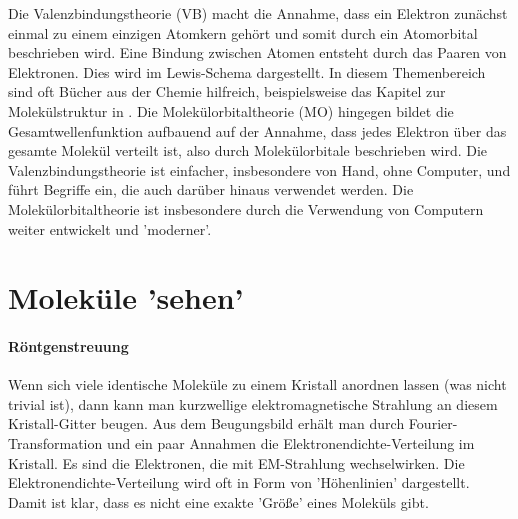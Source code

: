 Die Valenzbindungstheorie (VB) macht die Annahme, dass ein Elektron zunächst einmal zu einem einzigen Atomkern gehört und somit durch ein Atomorbital beschrieben wird. Eine Bindung zwischen Atomen entsteht durch das Paaren von Elektronen. Dies wird im Lewis-Schema dargestellt. In diesem Themenbereich sind oft Bücher aus der Chemie hilfreich, beispielsweise das Kapitel zur Molekülstruktur in \cite{Atkins}.
Die Molekülorbitaltheorie (MO) hingegen bildet die Gesamtwellenfunktion aufbauend auf der Annahme, dass jedes Elektron über das gesamte Molekül verteilt ist, also durch Molekülorbitale beschrieben wird. Die Valenzbindungstheorie ist einfacher, insbesondere von Hand, ohne Computer, und führt Begriffe ein, die auch darüber hinaus verwendet werden. Die Molekülorbitaltheorie ist insbesondere durch die Verwendung von Computern weiter entwickelt und 'moderner'.



\section{Moleküle 'sehen'}

\paragraph{Röntgenstreuung} Wenn sich viele identische Moleküle zu einem Kristall anordnen lassen (was nicht trivial ist), dann kann man kurzwellige elektromagnetische Strahlung an diesem  Kristall-Gitter beugen. Aus dem Beugungsbild erhält man durch Fourier-Transformation und ein paar Annahmen die Elektronendichte-Verteilung im Kristall. Es sind die Elektronen, die mit EM-Strahlung wechselwirken. Die Elektronendichte-Verteilung wird oft in Form von 'Höhenlinien' dargestellt. Damit ist klar, dass es nicht eine exakte 'Größe' eines Moleküls gibt.



